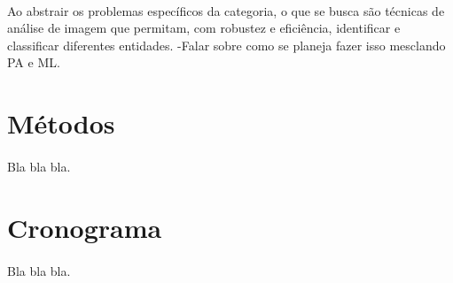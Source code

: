 \documentclass[11pt]{report}
\begin{document}
\paragraph{}
Ao abstrair os problemas específicos da categoria, o que se busca são técnicas 
de análise de imagem que permitam, com robustez e eficiência, identificar 
e classificar diferentes entidades.
-Falar sobre como se planeja fazer isso mesclando PA e ML.

\section{Métodos}
\paragraph{}
Bla bla bla.\cite{biba}

\section{Cronograma}
\paragraph{}
Bla bla bla.



\end{document}

